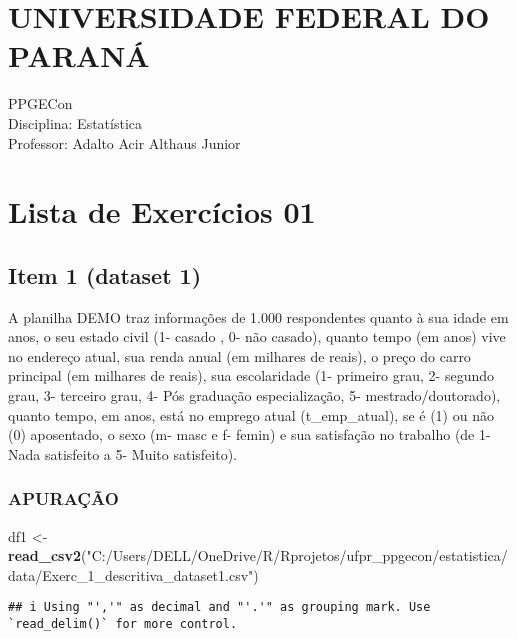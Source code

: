 \documentclass[
]{article}
\author{}
\date{\vspace{-2.5em}}
\newenvironment{Shaded}{\begin{snugshade}}{\end{snugshade}}
\newcommand{\FunctionTok}[1]{\textcolor[rgb]{0.13,0.29,0.53}{\textbf{#1}}}
\newcommand{\NormalTok}[1]{#1}
\newcommand{\OtherTok}[1]{\textcolor[rgb]{0.56,0.35,0.01}{#1}}
\newcommand{\StringTok}[1]{\textcolor[rgb]{0.31,0.60,0.02}{#1}}
\begin{document}
\hypertarget{universidade-federal-do-paranuxe1}{%
\section{UNIVERSIDADE FEDERAL DO
PARANÁ}\label{universidade-federal-do-paranuxe1}}

PPGECon\\
Disciplina: Estatística\\
Professor: Adalto Acir Althaus Junior

\hypertarget{lista-de-exercuxedcios-01}{%
\section{Lista de Exercícios 01}\label{lista-de-exercuxedcios-01}}

\hypertarget{item-1-dataset-1}{%
\subsection{Item 1 (dataset 1)}\label{item-1-dataset-1}}

A planilha DEMO traz informações de 1.000 respondentes quanto à sua
idade em anos, o seu estado civil (1- casado , 0- não casado), quanto
tempo (em anos) vive no endereço atual, sua renda anual (em milhares de
reais), o preço do carro principal (em milhares de reais), sua
escolaridade (1- primeiro grau, 2- segundo grau, 3- terceiro grau, 4-
Pós graduação especialização, 5- mestrado/doutorado), quanto tempo, em
anos, está no emprego atual (t\_emp\_atual), se é (1) ou não (0)
aposentado, o sexo (m- masc e f- femin) e sua satisfação no trabalho (de
1- Nada satisfeito a 5- Muito satisfeito).

\hypertarget{apurauxe7uxe3o}{%
\subsubsection{APURAÇÃO}\label{apurauxe7uxe3o}}

\begin{Shaded}
\begin{Highlighting}[]
\NormalTok{df1 }\OtherTok{\textless{}{-}} \FunctionTok{read\_csv2}\NormalTok{(}\StringTok{"C:/Users/DELL/OneDrive/R/Rprojetos/ufpr\_ppgecon/estatistica/data/Exerc\_1\_descritiva\_dataset1.csv"}\NormalTok{)}
\end{Highlighting}
\end{Shaded}

\begin{verbatim}
## i Using "','" as decimal and "'.'" as grouping mark. Use `read_delim()` for more control.
\end{verbatim}
\end{document}
